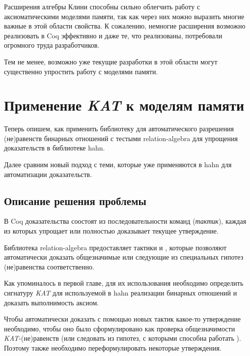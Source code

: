 \documentclass[times
              ]{itmo-student-thesis}
\begin{document}
  \chapterconclusion
    Расширения алгебры Клини способны сильно облегчить работу с аксиоматическими моделями памяти,
    так как через них можно выразить многие важные в этой области свойства. К сожалению, немногие
    расширения возможно реализовать в Coq эффективно и даже те, что реализованы, потребовали огромного труда разработчиков.

    Тем не менее, возможно уже текущие разработки в этой области могут существенно упростить работу с моделями памяти.

\chapter{Применение \textit{KAT} к моделям памяти}

  Теперь опишем, как применить библиотеку для автоматического разрешения (не)равенств бинарных
  отношений с тестыми relation-algebra для упрощения доказательств в библиотеке hahn.

  Далее сравним новый подход с теми, которые уже применяются в hahn для автоматизации доказательств.

  \section{Описание решения проблемы}

    В Coq доказательства соостоят из последовательности команд (\textit{тактик}), каждая из
    которых упрощает или полностью доказывает текущее утверждение.

    Библиотека relation-algebra предоставляет тактики  и ,
    которые позволяют автоматически доказать общезначимые или следующие из специальных гипотез
    (не)равенства соответственно.

    Как упоминалось в первой главе, для их использования необходимо определить сигнатуру \textit{KAT} для
    используемой в hahn реализации бинарных отношений и доказать выполнимость аксиом.

    Чтобы автоматически доказать с помощью новых тактик какое-то утверждение необходимо, чтобы оно было
    сформулировано как проверка общезначимости \textit{KAT}-(не)равенств (или следовать из гипотез, с которыми
    способна работать ).
    Поэтому также необходимо переформулировать некоторые утверждения.
\end{document}
